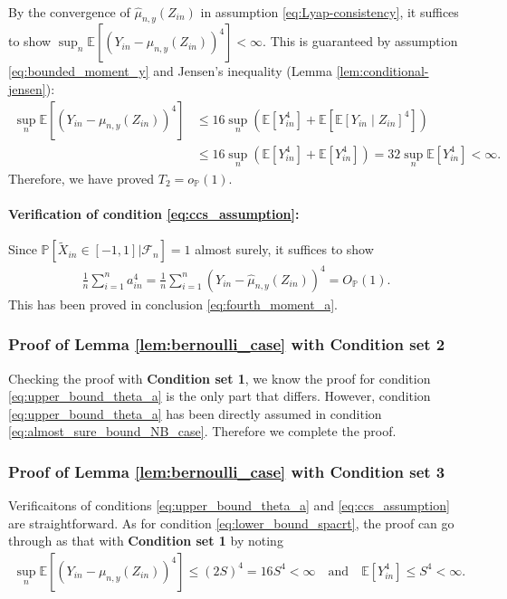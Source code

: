 \documentclass[12pt]{article}
\theoremstyle{definition}
\def\P{\mathbb{P}}
\def\P{\mathbb{P}}
\newcommand{\E}{\mathbb E}								%
\renewcommand{\P}{\mathbb{P}}							%
\newcommand{\srz}{Z}									%
\newcommand{\srxk}{\widetilde X}						%
\newcommand{\sry}{Y}									%
\begin{document}
\begin{enumerate}
\begin{align*}
		\end{align*}
		By the convergence of $\widehat{\mu}_{n,y}(\srz_{in})$ in assumption \eqref{eq:Lyap-consistency}, it suffices to show $\sup_n\E[(\sry_{in}-\mu_{n,y}(\srz_{in}))^4]<\infty$. This is guaranteed by assumption \eqref{eq:bounded_moment_y} and Jensen's inequality (Lemma \ref{lem:conditional-jensen}):
		\begin{align*}
			\sup_n\E[(\sry_{in}-\mu_{n,y}(\srz_{in}))^4]
			&
			\leq 16\sup_n(\E[\sry_{in}^4]+\E[\E[\sry_{in}\mid\srz_{in}]^4])\\
			&
			\leq  16\sup_n(\E[\sry_{in}^4]+\E[\sry_{in}^4])=32\sup_n\E[\sry_{in}^4]<\infty.
		\end{align*}
		Therefore, we have proved $T_2=o_{\P}(1)$. 
	\end{enumerate}

  \paragraph{Verification of condition \eqref{eq:ccs_assumption}:}

  Since $\P[\srxk_{in}\in [-1,1]|\mathcal{F}_n]=1$ almost surely, it suffices to show 
  \begin{align*}
    \frac{1}{n}\sum_{i=1}^n a_{in}^4=\frac{1}{n}\sum_{i=1}^n (\sry_{in}-\widehat{\mu}_{n,y}(\srz_{in}))^4=O_{\P}(1).
  \end{align*}
  This has been proved in conclusion \eqref{eq:fourth_moment_a}.

\subsubsection{Proof of Lemma \ref{lem:bernoulli_case} with Condition set 2}

Checking the proof with \textbf{Condition set 1}, we know the proof for condition \eqref{eq:upper_bound_theta_a} is the only part that differs. However, condition \eqref{eq:upper_bound_theta_a} has been directly assumed in condition \eqref{eq:almost_sure_bound_NB_case}. Therefore we complete the proof.

\subsubsection{Proof of Lemma \ref{lem:bernoulli_case} with Condition set 3}

Verificaitons of conditions \eqref{eq:upper_bound_theta_a} and \eqref{eq:ccs_assumption} are straightforward. As for condition \eqref{eq:lower_bound_spacrt}, the proof can go through as that with \textbf{Condition set 1} by noting
\begin{align*}
  \sup_n\E[(\sry_{in}-\mu_{n,y}(\srz_{in}))^4]\leq (2S)^4=16S^4<\infty\quad\text{and}\quad \E[\sry_{in}^4]\leq S^4<\infty.
\end{align*}
\end{document}
